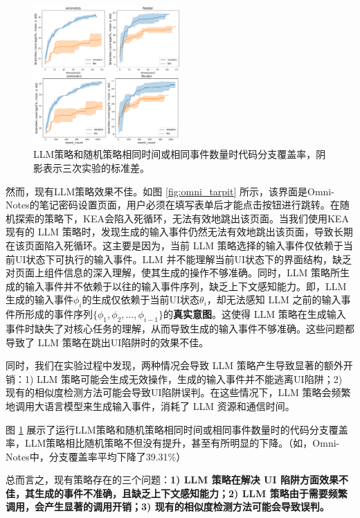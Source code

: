 \documentclass[twocolumn, 10pt]{article}
\newcommand{\kea}{K{\small\MakeUppercase{ea}}}
\begin{document}
\begin{figure}[ht!]
    \centering
    \includegraphics[width=0.5\textwidth]{llm_test}
    \caption{LLM策略和随机策略相同时间或相同事件数量时代码分支覆盖率，阴影表示三次实验的标准差。}
    \label{fig:llm_test}
\end{figure}

然而，现有LLM策略效果不佳。如图 \ref{fig:omni_tarpit} 所示，该界面是Omni-Notes的笔记密码设置页面，用户必须在填写表单后才能点击按钮进行跳转。在随机探索的策略下，\kea 会陷入死循环，无法有效地跳出该页面。当我们使用\kea 现有的 LLM 策略时，发现生成的输入事件仍然无法有效地跳出该页面，导致长期在该页面陷入死循环。这主要是因为，当前 LLM 策略选择的输入事件仅依赖于当前UI状态下可执行的输入事件。LLM 并不能理解当前UI状态下的界面结构，缺乏对页面上组件信息的深入理解，使其生成的操作不够准确。同时，LLM 策略所生成的输入事件并不依赖于以往的输入事件序列，缺乏上下文感知能力。即，LLM 生成的输入事件$\phi_i$的生成仅依赖于当前UI状态$\theta_i$，却无法感知 LLM 之前的输入事件所形成的事件序列$\{\phi_1, \phi_2, \ldots, \phi_{i-1}\}$的\textbf{真实意图}。这使得 LLM 策略在生成输入事件时缺失了对核心任务的理解，从而导致生成的输入事件不够准确。这些问题都导致了 LLM 策略在跳出UI陷阱时的效果不佳。

同时，我们在实验过程中发现，两种情况会导致 LLM 策略产生导致显著的额外开销：1) LLM 策略可能会生成无效操作，生成的输入事件并不能逃离UI陷阱；2) 现有的相似度检测方法可能会导致UI陷阱误判。在这些情况下，LLM 策略会频繁地调用大语言模型来生成输入事件，消耗了 LLM 资源和通信时间。

图 \ref{fig:llm_test} 展示了运行LLM策略和随机策略相同时间或相同事件数量时的代码分支覆盖率，LLM策略相比随机策略不但没有提升，甚至有所明显的下降。（如，Omni-Notes中，分支覆盖率平均下降了39.31\%）

总而言之，现有策略存在的三个问题：\textbf{1) LLM 策略在解决 UI 陷阱方面效果不佳，其生成的事件不准确，且缺乏上下文感知能力；2) LLM 策略由于需要频繁调用，会产生显著的调用开销；3) 现有的相似度检测方法可能会导致误判。}
\end{document}
